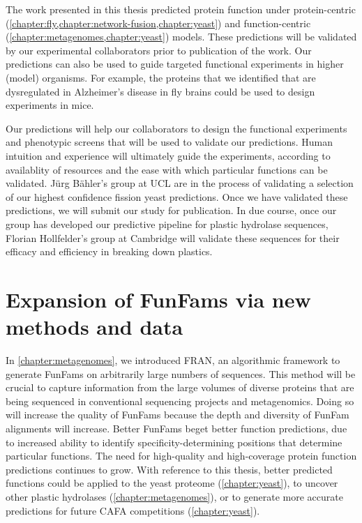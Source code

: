 The work presented in this thesis predicted protein function under protein-centric (\ref{chapter:fly,chapter:network-fusion,chapter:yeast}) and function-centric (\ref{chapter:metagenomes,chapter:yeast}) models. These predictions will be validated by our experimental collaborators prior to publication of the work. Our predictions can also be used to guide targeted functional experiments in higher (model) organisms. For example, the proteins that we identified that are dysregulated in Alzheimer's disease in fly brains could be used to design experiments in mice.

Our predictions will help our collaborators to design the functional experiments and phenotypic screens that will be used to validate our predictions. Human intuition and experience will ultimately guide the experiments, according to availablity of resources and the ease with which particular functions can be validated. Jürg Bähler's group at UCL are in the process of validating a selection of our highest confidence fission yeast predictions. Once we have validated these predictions, we will submit our study for publication. In due course, once our group has developed our predictive pipeline for plastic hydrolase sequences, Florian Hollfelder's group at Cambridge will validate these sequences for their efficacy and efficiency in breaking down plastics.

\section{Expansion of FunFams via new methods and data}

In \ref{chapter:metagenomes}, we introduced FRAN, an algorithmic framework to generate FunFams on arbitrarily large numbers of sequences. This method will be crucial to capture information from the large volumes of diverse proteins that are being sequenced in conventional sequencing projects and metagenomics. Doing so will increase the quality of FunFams because the depth and diversity of FunFam alignments will increase. Better FunFams beget better function predictions, due to increased ability to identify specificity-determining positions that determine particular functions. The need for high-quality and high-coverage protein function predictions continues to grow. With reference to this thesis, better predicted functions could be applied to the yeast proteome (\ref{chapter:yeast}), to uncover other plastic hydrolases (\ref{chapter:metagenomes}), or to generate more accurate predictions for future CAFA competitions (\ref{chapter:yeast}).

